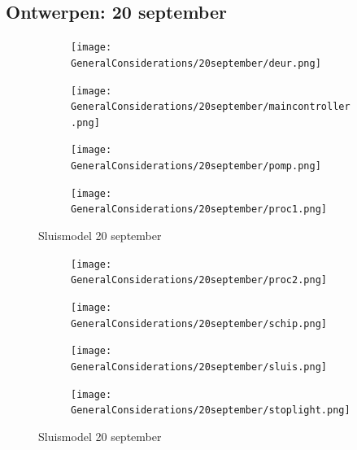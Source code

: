 \documentclass{article}
\begin{document}
	\subsection{Ontwerpen: 20 september}
	\begin{figure}
		\centering
		\begin{subfigure}{0.45\linewidth}
			\texttt{[image: GeneralConsiderations/20september/deur.png]}
			\caption{}
			\label{fig:1a}
		\end{subfigure}\hfill
		\begin{subfigure}{0.45\linewidth}
			\texttt{[image: GeneralConsiderations/20september/maincontroller.png]}
			\caption{}
			\label{fig:1a}
		\end{subfigure}
		
		\begin{subfigure}{0.45\linewidth}
			\texttt{[image: GeneralConsiderations/20september/pomp.png]}
			\caption{}
			\label{fig:1a}
		\end{subfigure}\hfill
		\begin{subfigure}{0.45\linewidth}
			\texttt{[image: GeneralConsiderations/20september/proc1.png]}
			\caption{}
			\label{fig:1a}
		\end{subfigure}
		\caption{Sluismodel 20 september}
		\label{fig:1}
	\end{figure}
	
	\begin{figure}
		\centering
		\begin{subfigure}{0.45\linewidth}
			\texttt{[image: GeneralConsiderations/20september/proc2.png]}
			\caption{}
			\label{fig:1a}
		\end{subfigure}\hfill
		\begin{subfigure}{0.45\linewidth}
			\texttt{[image: GeneralConsiderations/20september/schip.png]}
			\caption{}
			\label{fig:1a}
		\end{subfigure}
		
		\begin{subfigure}{0.45\linewidth}
			\texttt{[image: GeneralConsiderations/20september/sluis.png]}
			\caption{}
			\label{fig:1a}
		\end{subfigure}\hfill
		\begin{subfigure}{0.45\linewidth}
			\texttt{[image: GeneralConsiderations/20september/stoplight.png]}
			\caption{}
			\label{fig:1a}
		\end{subfigure}
		\caption{Sluismodel 20 september}
		\label{fig:1}
	\end{figure}
	
\end{document}
